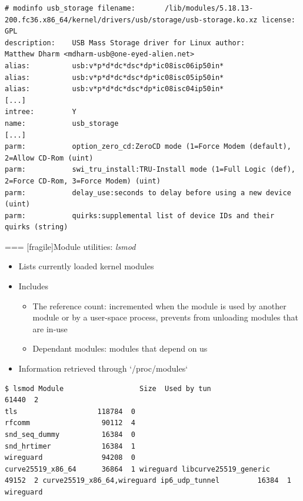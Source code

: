   \begin{block}{}
    {\tiny
\begin{verbatim}
# modinfo usb_storage filename:       /lib/modules/5.18.13-200.fc36.x86_64/kernel/drivers/usb/storage/usb-storage.ko.xz license:        GPL
description:    USB Mass Storage driver for Linux author:         Matthew Dharm <mdharm-usb@one-eyed-alien.net>
alias:          usb:v*p*d*dc*dsc*dp*ic08isc06ip50in*
alias:          usb:v*p*d*dc*dsc*dp*ic08isc05ip50in*
alias:          usb:v*p*d*dc*dsc*dp*ic08isc04ip50in*
[...]
intree:         Y
name:           usb_storage
[...]
parm:           option_zero_cd:ZeroCD mode (1=Force Modem (default), 2=Allow CD-Rom (uint)
parm:           swi_tru_install:TRU-Install mode (1=Full Logic (def), 2=Force CD-Rom, 3=Force Modem) (uint)
parm:           delay_use:seconds to delay before using a new device (uint)
parm:           quirks:supplemental list of device IDs and their quirks (string)
\end{verbatim}
    }
  \end{block}


=== [fragile]{Module utilities: {\em lsmod}}

  \begin{itemize}
  \item Lists currently loaded kernel modules
  \item Includes
    \begin{itemize}
    \item The reference count: incremented when the module is used by
      another module or by a user-space process, prevents from unloading
      modules that are in-use
    \item Dependant modules: modules that depend on us
    \end{itemize}
  \item Information retrieved through `/proc/modules`
  \end{itemize}

  \begin{block}{}
    {\footnotesize
\begin{verbatim}
$ lsmod Module                  Size  Used by tun                    61440  2
tls                   118784  0
rfcomm                 90112  4
snd_seq_dummy          16384  0
snd_hrtimer            16384  1
wireguard              94208  0
curve25519_x86_64      36864  1 wireguard libcurve25519_generic    49152  2 curve25519_x86_64,wireguard ip6_udp_tunnel         16384  1 wireguard
\end{verbatim}
    }
  \end{block}


